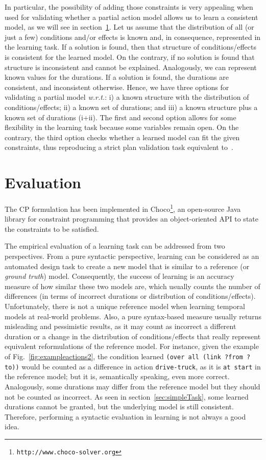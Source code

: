 \documentclass{ecai}
\begin{document}
In particular, the possibility of adding those constraints is very appealing when used for validating whether a partial action model allows us to learn a consistent model, as we will see in section~\ref{sec:evaluation}. Let us assume that the distribution of all (or just a few) conditions and/or effects is known and, in consequence, represented in the learning task. If a solution is found, then that structure of conditions/effects is consistent for the learned model. On the contrary, if no solution is found that structure is inconsistent and cannot be explained. Analogously, we can represent known values for the durations. If a solution is found, the durations are consistent, and inconsistent otherwise. Hence, we have three options for validating a partial model \emph{w.r.t.}: i) a known structure with the distribution of conditions/effects; ii) a known set of durations; and iii) a known structure plus a known set of durations (i+ii). The first and second option allows for some flexibility in the learning task because some variables remain open. On the contrary, the third option checks whether a learned model can fit the given constraints, thus reproducing a strict plan validation task equivalent to~\cite{howey2004val}.



\section{Evaluation}
\label{sec:evaluation}
The CP formulation has been implemented in \textsf{Choco}\footnote{\texttt{http://www.choco-solver.org}}, an open-source Java library for constraint programming that provides an object-oriented API to state the constraints to be satisfied.

The empirical evaluation of a learning task can be addressed from two perspectives. From a pure syntactic perspective, learning can be considered as an automated design task to create a new model that is similar to a reference (or {\em ground truth}) model. Consequently, the success of learning is an accuracy measure of how similar these two models are, which usually counts the number of differences (in terms of incorrect durations or distribution of conditions/effects). Unfortunately, there is not a unique reference model when learning temporal models at real-world problems. Also, a pure syntax-based measure usually returns misleading and pessimistic results, as it may count as incorrect a different duration or a change in the distribution of conditions/effects that really represent equivalent reformulations of the reference model. For instance, given the example of Fig.~\ref{fig:exampleactions2}, the condition learned \texttt{(over all (link ?from ?to))} would be counted as a difference in action \texttt{drive-truck}, as it is \texttt{at start} in the reference model; but it is, semantically speaking, even more correct. Analogously, some durations may differ from the reference model but they should not be counted as incorrect. As seen in section~\ref{sec:simpleTask}, some learned durations cannot be granted, but the underlying model is still consistent. Therefore, performing a syntactic evaluation in learning is not always a good idea.
\end{document}
